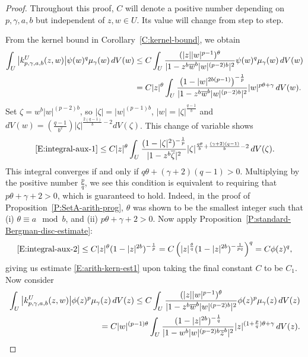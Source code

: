\documentclass[letterpaper,11pt,reqno]{amsart}
\theoremstyle{plain}
\theoremstyle{definition}
\theoremstyle{remark}
\theoremstyle{remark}
\numberwithin{equation}{section}
\newcommand{\ol}{\overline}
\newcommand{\mug}{{\mu_{\gamma}}}
\begin{document}
\begin{proof}
Throughout this proof, $C$ will denote a positive number depending on $p,\gamma,a,b$ but independent of $z,w\in U$. 
Its value will change from step to step. 

From the kernel bound in Corollary~\ref{C:kernel-bound}, we obtain
\begin{align}
\int_{U} \big|k_{p,\gamma,a,b}^{U}(z,w)\big| \psi(w)^q \mug(w)\, dV(w) 
 &\le C \int_{U} \frac{(|z||w|^{p-1})^{\theta}}{|1-z^b\ol{w}^b|w|^{(p-2)b}|^2} \psi(w)^q \mug(w)\, dV(w) \notag \\
&= C|z|^{\theta} \int_{U} \frac{ \left(1-|w|^{2b(p-1)}\right)^{-\frac{1}{p}} }{|1-z^b\ol{w}^b|w|^{(p-2)b}|^2} |w|^{p\theta + \gamma} \, dV(w). \label{E:integral-aux-1}
\end{align}
Set $\zeta = w^b|w|^{(p-2)b}$, so $|\zeta| = |w|^{(p-1)b}$,  $|w| = |\zeta|^{\frac{q-1}{b}}$ and $dV(w) = \left(\frac{q-1}{b^2}\right) |\zeta|^{\frac{2(q-1)}{b}-2}dV(\zeta)$. 
This change of variable shows
\begin{align}\label{E:integral-aux-2}
\eqref{E:integral-aux-1} \le C |z|^{\theta} \int_{U} \frac{(1-|\zeta|^2)^{-\frac{1}{p}}}{|1-z^b\ol{\zeta}|^2} |\zeta|^{\frac{q\theta}{b} + \frac{(\gamma+2)(q-1)}{b} - 2}\, dV(\zeta).
\end{align}
This integral converges if and only if $q\theta + (\gamma+2)(q-1) > 0$.
Multiplying by the positive number $\frac{p}{q}$, we see this condition is equivalent to requiring that $p\theta + \gamma + 2 > 0$, which is guaranteed to hold.
Indeed, in the proof of Proposition~\ref{P:SetA-arith-prog}, $\theta$ was shown to be the smallest integer such that (i) $\theta \equiv a \mod b$, and (ii) $p\theta + \gamma + 2 > 0$.
 Now apply Proposition~\ref{P:standard-Bergman-disc-estimate}:
\begin{align*}
\eqref{E:integral-aux-2} \le C |z|^{\theta} (1-|z|^{2b})^{-\frac{1}{p}} = C \left( |z|^{\frac{\theta}{q}}(1-|z|^{2b})^{-\frac{1}{pq}} \right)^q = C \phi(z)^q,
\end{align*}
giving us estimate \eqref{E:arith-kern-est1} upon taking the final constant $C$ to be $C_1$. 
Now consider
\begin{align}
\int_{U} \big|k_{p,\gamma,a,b}^{U}(z,w)\big| \phi(z)^p \mug(z)\, dV(z)\le C \int_{U} \frac{(|z||w|^{p-1})^{\theta}}{|1-z^b\ol{w}^b|w|^{(p-2)b}|^2} \phi(z)^p \mug(z)\, dV(z) \notag \\
= C |w|^{(p-1)\theta}\int_{U} \frac{(1-|z|^{2b})^{-\frac{1}{q}}}{|1- w^b|w|^{(p-2)b}\ol{z}^b|^2}|z|^{(1 + \frac{p}{q})\theta+\gamma}\,dV(z). \label{E:integral-aux-3}

\end{align}
\end{proof}
\end{document}

